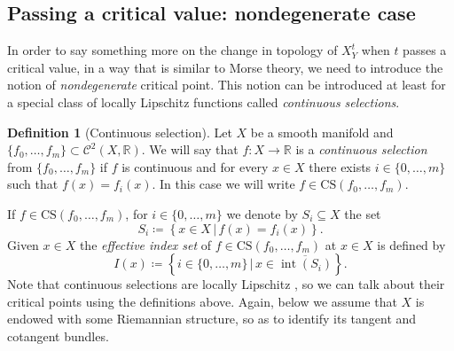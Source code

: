 \documentclass{amsart}
\newcommand{\R}{\mathbb{R}}
\theoremstyle{definition}
\newtheorem{definition}[subsubsection]{Definition}
\theoremstyle{remark}
\begin{document}
\subsection{Passing a critical value: nondegenerate case}

In order to say something more on the change in topology  of $X_Y^t$ when $t$ passes a critical value, in a way that is similar to Morse theory, we need to introduce the notion of \emph{nondegenerate} critical point.
This notion can be introduced at least for a special class of locally Lipschitz functions called \emph{continuous selections}.

\begin{definition}[Continuous selection]
Let $X$ be a smooth manifold and $\{f_0, \ldots, f_m\}\subset \mathcal{C}^2(X, \R)$. We will say that $f \colon X\to \R$ is a \emph{continuous selection} from $\{f_0, \ldots, f_m\}$ if $f$ is continuous and for every $x\in X$ there exists $i\in \{0, \ldots, m\}$ such that $f(x)=f_i(x).$
In this case we will write $f\in \mathrm{CS}(f_0, \ldots, f_m)$.
\end{definition}
If $f\in \mathrm{CS}(f_0, \ldots, f_m)$, for $i\in \{0, \ldots, m\}$ we denote by $S_i\subseteq X$  the set
\[
S_i\coloneqq\left\{x\in X\,\bigg|\, f(x)=f_i(x)\right\}.
\]
Given $x\in X$ the \emph{effective index set} of $f\in \mathrm{CS}(f_0, \ldots, f_m)$ at $x\in X$ is defined by
\[
I(x)\coloneqq\left\{i\in \{0, \ldots, m\}\,\bigg|\, x\in \overline{\operatorname{int}(S_i)}\right\}.
\]
Note that continuous selections are locally Lipschitz \cite{APS1997}, so we can talk about their critical points using the definitions above. Again, below we assume that $X$ is endowed with some Riemannian structure, so as to identify its tangent and cotangent bundles.
\end{document}
